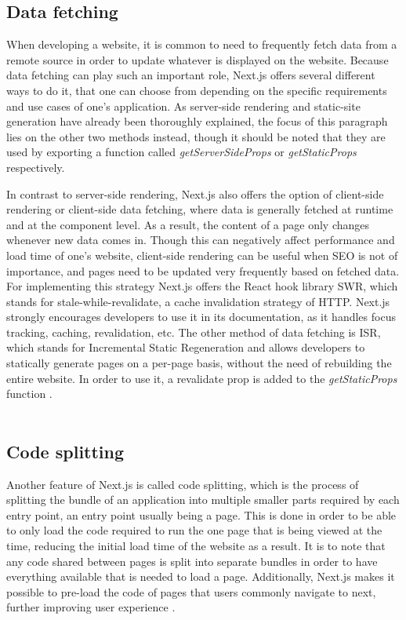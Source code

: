 \subsection{Data fetching}
When developing a website, it is common to need to frequently fetch data from a remote source in order to update whatever is displayed
on the website. Because data fetching can play such an important role, Next.js offers several different ways to do it, that one can choose
from depending on the specific requirements and use cases of one's application. As server-side rendering and static-site generation have already
been thoroughly explained, the focus of this paragraph lies on the other two methods instead, though it should be noted that they are used by
exporting a function called \emph{getServerSideProps} or \emph{getStaticProps} respectively.

In contrast to server-side rendering, Next.js also offers the
option of client-side rendering or client-side data fetching, where data is generally fetched at runtime and at the component level. As a
result, the content of a page only changes whenever new data comes in. Though this can negatively affect performance and load time of one's
website, client-side rendering can be useful when SEO is not of importance, and pages need to be updated very frequently based on fetched data.
For implementing this strategy Next.js offers the React hook library SWR, which stands for stale-while-revalidate, a cache invalidation strategy
of HTTP. Next.js strongly encourages developers to use it in its documentation, as it handles focus tracking, caching, revalidation, etc. The
other method of data fetching is ISR, which stands for Incremental Static Regeneration and allows developers to statically generate pages on a
per-page basis, without the need of rebuilding the entire website. In order to use it, a revalidate prop is added to the \emph{getStaticProps} function \cite{NextjsDataFetching}.
\\
\\
\subsection{Code splitting}
Another feature of Next.js is called code splitting, which is the process of splitting the bundle of an application into multiple smaller parts
required by each entry point, an entry point usually being a page. This is done in order to be able to only load the code required to run the one
page that is being viewed at the time, reducing the initial load time of the website as a result. It is to note that any code shared between pages
is split into separate bundles in order to have everything available that is needed to load a page. Additionally, Next.js makes it possible to
pre-load the code of pages that users commonly navigate to next, further improving user experience \cite{NextjsCodeSplitting}.
\\
\\
